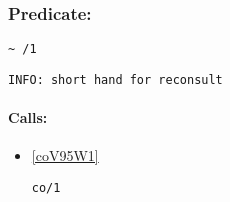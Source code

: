 \subsubsection{Predicate:} \label{V126WV95W1}

\begin{verbatim}
~ /1
\end{verbatim}

{\small \begin{verbatim}
INFO: short hand for reconsult

\end{verbatim}}
\paragraph{Calls:} 
\begin{itemize}
\item \ref{coV95W1} 
\begin{verbatim}
co/1
\end{verbatim}

\end{itemize}

